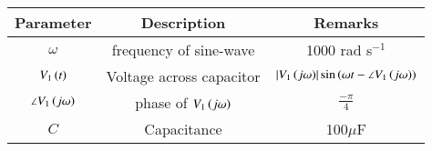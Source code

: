 \setlength{\arrayrulewidth}{0.3mm}
\setlength{\tabcolsep}{20pt}
\renewcommand{\arraystretch}{1.3}



\begin{tabular}{|c|c|c|}
\hline

Parameter& Description & Remarks\\
\hline
$\omega$ & frequency of sine-wave & 1000 rad s$^{-1}$\\
\hline
$V_1\left(t\right)$ & Voltage across capacitor & $\left\vert V_1\left(j\omega\right)\right\vert\sin\left(\omega t - \angle{V_1\ensuremath{\left(j\omega\right)}}\right)$\\
\hline
$\angle{V_1\ensuremath{\left(j\omega\right)}} $ & phase of $V_1\left(j\omega\right)$ & $\frac{-\pi}{4}$\\
\hline
$C$ & Capacitance & 100$\mu$F\\
\hline

\end{tabular}





